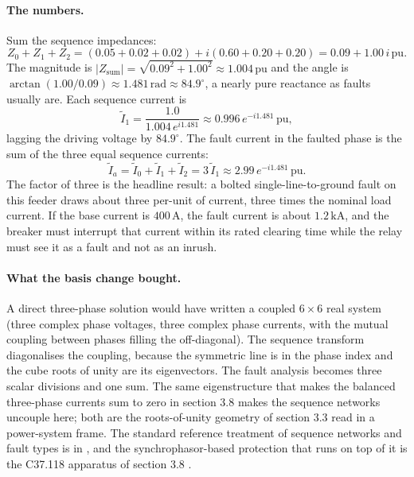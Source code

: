 \paragraph{The numbers.} Sum the sequence impedances:
\[
Z_{0} + Z_{1} + Z_{2} = (0.05 + 0.02 + 0.02) + i(0.60 + 0.20 + 0.20)
= 0.09 + 1.00\,i\,\text{pu}.
\]
The magnitude is $|Z_{\text{sum}}| = \sqrt{0.09^{2} + 1.00^{2}} \approx
1.004\,\text{pu}$ and the angle is $\arctan(1.00/0.09) \approx
1.481\,\text{rad} \approx 84.9^{\circ}$, a nearly pure reactance as
faults usually are. Each sequence current is
\[
\tilde I_{1} = \frac{1.0}{1.004\,e^{i 1.481}} \approx 0.996\,e^{-i 1.481}\,\text{pu},
\]
lagging the driving voltage by $84.9^{\circ}$. The fault current in the
faulted phase is the sum of the three equal sequence currents:
\[
\tilde I_{a} = \tilde I_{0} + \tilde I_{1} + \tilde I_{2} = 3\,\tilde I_{1}
\approx 2.99\,e^{-i 1.481}\,\text{pu}.
\]
The factor of three is the headline result: a bolted single-line-to-ground
fault on this feeder draws about three per-unit of current, three times
the nominal load current. If the base current is $400\,\si{\ampere}$, the
fault current is about $1.2\,\si{\kilo\ampere}$, and the breaker must
interrupt that current within its rated clearing time while the relay
must see it as a fault and not as an inrush.

\paragraph{What the basis change bought.} A direct three-phase solution
would have written a coupled $6 \times 6$ real system (three complex
phase voltages, three complex phase currents, with the mutual coupling
between phases filling the off-diagonal). The sequence transform
diagonalises the coupling, because the symmetric line is
 in the phase index and the cube roots of unity are
its eigenvectors. The fault analysis becomes three scalar divisions and
one sum. The same eigenstructure that makes the balanced three-phase
currents sum to zero in section 3.8 makes the sequence networks
uncouple here; both are the roots-of-unity geometry of section 3.3 read
in a power-system frame. The standard reference treatment of sequence
networks and fault types is in \cite[chapter 11]{text:v2ch03-nilsson-riedel},
and the synchrophasor-based protection that runs on top of it is the
C37.118 apparatus of section 3.8 \cite{paper:v2ch03-itrich-c37-118}.



